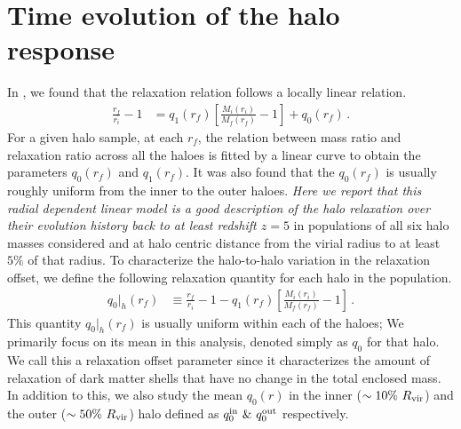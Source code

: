\section{Time evolution of the halo response}
\label{sec:methods-relchar}
In , we found that the relaxation relation follows a locally linear relation. 
\begin{align}
    \frac{r_f}{r_i} - 1 &= q_1(r_f) \left[ \frac{M_i(r_i)}{M_f(r_f)} - 1 \right] + q_0(r_f)\,.
\end{align}
For a given halo sample, at each $r_f$, the relation between mass ratio and relaxation ratio across all the haloes is fitted by a linear curve to obtain the parameters $q_0(r_f)$ and $q_1(r_f)$. It was also found that the $q_0(r_f)$ is usually roughly uniform from the inner to the outer haloes. \emph{Here we report that this radial dependent linear model is a good description of the halo relaxation over their evolution history back to at least redshift $z=5$} in populations of all six halo masses considered and at halo centric distance from the virial radius to at least $5 \%$ of that radius. To characterize the halo-to-halo variation in the relaxation offset, we define the following relaxation quantity for each halo in the population. 
\begin{align}
\label{eq:def-q0hal}
q_0 |_{h}(r_f) &\equiv \frac{r_f}{r_i} - 1 - q_1(r_f) \left[ \frac{M_i(r_i)}{M_f(r_f)} - 1 \right]\,.
\end{align}
This quantity $q_0 |_{h}(r_f)$ is usually uniform within each of the haloes; We primarily focus on its mean in this analysis, denoted simply as $q_0$ for that halo. We call this a relaxation offset parameter since it characterizes the amount of relaxation of dark matter shells that have no change in the total enclosed mass. In addition to this, we also study the mean $q_0(r)$ in the inner ($\sim 10\%~R_{\rm{vir}}$) and the outer ($\sim 50\%~R_{\rm{vir}}$) halo defined as $q_0^{\rm{in}} ~\& ~q_0^{\rm{out}}$ respectively.

